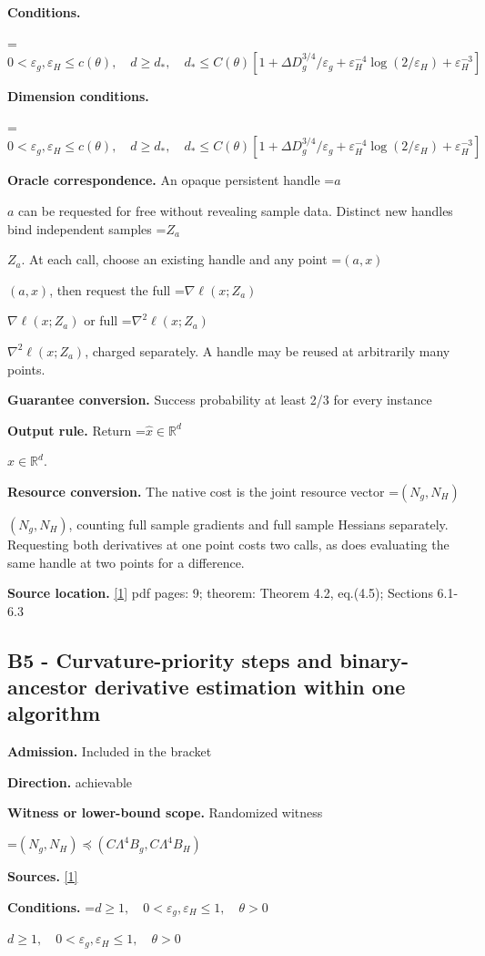 \documentclass[10pt,a4paper]{article}
\newcommand{\AtlasMath}[1]{\par\begingroup\centering\setbox0=\hbox{$\displaystyle #1$}\ifdim\wd0>1.4\linewidth\typeout{ATLAS WIDE FORMULA: \the\wd0}\fi\ifdim\wd0>\linewidth\resizebox{\linewidth}{!}{\box0}\else\box0\fi\par\endgroup}
\newcommand{\AtlasInlineMath}[1]{\begingroup\setbox0=\hbox{$#1$}\ifdim\wd0>.4\linewidth\endgroup\AtlasMath{#1}\else\endgroup$#1$\fi}
\begin{document}
\textbf{Conditions.} 
\AtlasMath{0<\varepsilon_g,\varepsilon_H\le c(\theta),\quad d\ge d_*,\quad d_*\le C(\theta)[1+\Delta D_g^{3/4}/\varepsilon_g+\varepsilon_H^{-4}\log(2/\varepsilon_H)+\varepsilon_H^{-3}]}


\textbf{Dimension conditions.} 
\AtlasMath{0<\varepsilon_g,\varepsilon_H\le c(\theta),\quad d\ge d_*,\quad d_*\le C(\theta)[1+\Delta D_g^{3/4}/\varepsilon_g+\varepsilon_H^{-4}\log(2/\varepsilon_H)+\varepsilon_H^{-3}]}


\textbf{Oracle correspondence.} An opaque persistent handle \AtlasInlineMath{a} can be requested for free without revealing sample data. Distinct new handles bind independent samples \AtlasInlineMath{Z_a}. At each call, choose an existing handle and any point \AtlasInlineMath{(a,x)}, then request the full \AtlasInlineMath{\nabla\ell(x;Z_a)} or full \AtlasInlineMath{\nabla^2\ell(x;Z_a)}, charged separately. A handle may be reused at arbitrarily many points.

\textbf{Guarantee conversion.} Success probability at least 2/3 for every instance

\textbf{Output rule.} Return \AtlasInlineMath{\widehat{x}\in \mathbb{R}^d}.

\textbf{Resource conversion.} The native cost is the joint resource vector \AtlasInlineMath{(N_g,N_H)}, counting full sample gradients and full sample Hessians separately. Requesting both derivatives at one point costs two calls, as does evaluating the same handle at two points for a difference.

\textbf{Source location.} \href{https://arxiv.org/pdf/2610.16832v2}{[1]} pdf pages: 9; theorem: Theorem 4.2, eq.(4.5); Sections 6.1-6.3

\subsection{B5 - Curvature-priority steps and binary-ancestor derivative estimation within one algorithm}
\textbf{Admission.} Included in the bracket

\textbf{Direction.} achievable

\textbf{Witness or lower-bound scope.} Randomized witness

\AtlasMath{(N_g,N_H)\preceq(C\Lambda^4 B_g,C\Lambda^4 B_H)}
\textbf{Sources.} \href{https://arxiv.org/pdf/2610.16832v2}{[1]}

\textbf{Conditions.} \AtlasInlineMath{d\ge1,\quad0<\varepsilon_g,\varepsilon_H\le1,\quad\theta>0}
\end{document}
